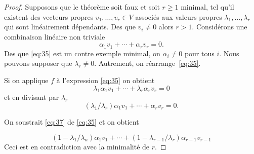 \begin{proof}
  Supposons que le théorème soit faux et soit $r≥1$ minimal, tel qu'il existent des vecteurs propres $v_1,\dots,v_r ∈V$  associés aux valeurs propres $λ_1,\dots,λ_r$ qui sont linéairement dépendants. Des que $v_i ≠0$ alors $r>1$.
  Considérons une combinaison linéaire non triviale
  \begin{equation}
    \label{eq:35}
    α_1 v_1 + \cdots + α_r v_r = 0.
  \end{equation}
  Des que \eqref{eq:35} est un contre exemple minimal, on  $α_i≠0$ pour tous $i$. Nous pouvons supposer que $λ_r ≠0$. Autrement, on réarrange~\eqref{eq:35}. 

  Si on applique $f$ à l'expression \eqref{eq:35} on obtient
  \begin{displaymath}
    λ_1 α_1 v_1 + \cdots + λ_rα_r v_r = 0
  \end{displaymath}
  et en divisant par $λ_r$
  \begin{equation}
    \label{eq:37}
    (λ_1/λ_r) α_1 v_1 + \cdots + α_r v_r = 0.
  \end{equation}

  On soustrait \eqref{eq:37} de \eqref{eq:35} et on obtient

  \begin{displaymath}
    (1- λ_1/λ_n)α_1 v_1 + \cdots + (1- λ_{r-1}/λ_r)α_{r-1} v_{r-1}
  \end{displaymath} Ceci est en contradiction avec la minimalité de $r$.
\end{proof}


